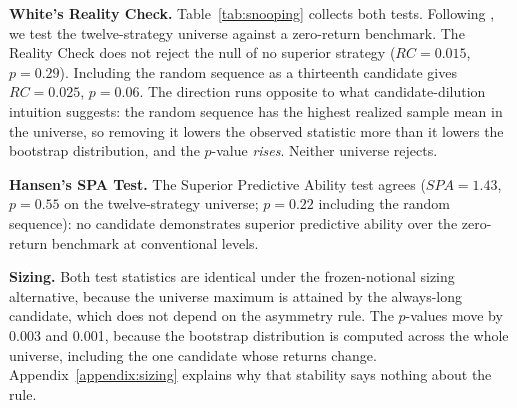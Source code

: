 \documentclass[11pt]{article}
\begin{document}
\textbf{White's Reality Check.} Table~\ref{tab:snooping} collects both tests. Following \citet{white2000reality}, we test the twelve-strategy universe against a zero-return benchmark. The Reality Check does not reject the null of no superior strategy ($RC = 0.015$, $p = 0.29$). Including the random sequence as a thirteenth candidate gives $RC = 0.025$, $p = 0.06$. The direction runs opposite to what candidate-dilution intuition suggests: the random sequence has the highest realized sample mean in the universe, so removing it lowers the observed statistic more than it lowers the bootstrap distribution, and the $p$-value \emph{rises}. Neither universe rejects.

\textbf{Hansen's SPA Test.} The Superior Predictive Ability test \citep{hansen2005test} agrees ($SPA = 1.43$, $p = 0.55$ on the twelve-strategy universe; $p = 0.22$ including the random sequence): no candidate demonstrates superior predictive ability over the zero-return benchmark at conventional levels.

\textbf{Sizing.} Both test statistics are identical under the frozen-notional sizing alternative, because the universe maximum is attained by the always-long candidate, which does not depend on the asymmetry rule. The $p$-values move by 0.003 and 0.001, because the bootstrap distribution is computed across the whole universe, including the one candidate whose returns change. Appendix~\ref{appendix:sizing} explains why that stability says nothing about the rule.
\end{document}
